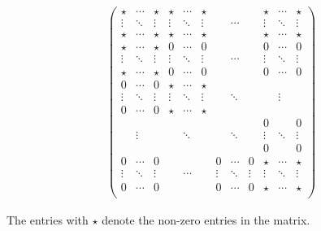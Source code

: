 \begin{align*}
	\left(\begin{array}{cccccccccccc}
		\star  & \cdots & \star  & \star  & \cdots & \star  &        &        &        & \star  & \cdots & \star  \\
		\vdots & \ddots & \vdots & \vdots & \ddots & \vdots &        & \cdots &        & \vdots & \ddots & \vdots \\
		\star  & \cdots & \star  & \star  & \cdots & \star  &        &        &        & \star  & \cdots & \star  \\
		\hline
		\star  & \cdots & \star  & 0      & \cdots & 0      &        &        &        & 0      & \cdots & 0      \\
		\vdots & \ddots & \vdots & \vdots & \ddots & \vdots &        & \cdots &        & \vdots & \ddots & \vdots \\
		\star  & \cdots & \star  & 0      & \cdots & 0      &        &        &        & 0      & \cdots & 0      \\
		0      & \cdots & 0      & \star  & \cdots & \star  &        &        &        &        &        &        \\
		\vdots & \ddots & \vdots & \vdots & \ddots & \vdots &        & \ddots &        &        & \vdots &        \\
		0      & \cdots & 0      & \star  & \cdots & \star  &        &        &        &        &        &        \\
		       &        &        &        &        &        &        &        &        & 0      &        & 0      \\
		       & \vdots &        &        & \ddots &        &        & \ddots &        & \vdots & \ddots & \vdots \\
		       &        &        &        &        &        &        &        &        & 0      &        & 0      \\
		0      & \cdots & 0      &        &        &        & 0      & \cdots & 0      & \star  & \cdots & \star  \\
		\vdots & \ddots & \vdots &        & \cdots &        & \vdots & \ddots & \vdots & \vdots & \ddots & \vdots \\
		0      & \cdots & 0      &        &        &        & 0      & \cdots & 0      & \star  & \cdots & \star  \\
	\end{array}\right)
\end{align*}

The entries with $\star$ denote the non-zero entries in the matrix.

